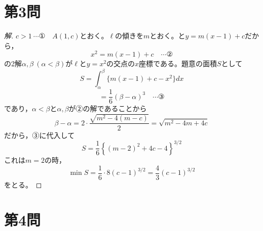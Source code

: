 \documentclass[../main.tex]{subfiles}
\begin{document}
\newpage

\section*{第3問}

\begin{proof}[解]
  $c>1\ \cdots$①　$A(1,c)$とおく。$\ell$の傾きを$m$とおく。と$y=m(x-1)+c$だから，
  \[
    x^2=m(x-1)+c \quad\cdots\text{②}
  \]
  の2解$\alpha,\beta\ (\alpha<\beta)$が$\ell$と$y=x^2$の交点の$x$座標である。題意の面積$S$として
  \[
    S=\int_\alpha^\beta\{m(x-1)+c-x^2\}dx
  \]
  \[
    =\frac16(\beta-\alpha)^3 \quad\cdots\text{③}
  \]
  であり，$\alpha<\beta$と$\alpha,\beta$が②の解であることから
  \[
    \beta-\alpha=2\cdot\frac{\sqrt{m^2-4(m-c)}}{2}=\sqrt{m^2-4m+4c}
  \]
  だから，③に代入して
  \[
    S=\frac16\left\{(m-2)^2+4c-4\right\}^{3/2}
  \]
  これは$m=2$の時，
  \[
    \min S=\frac16\cdot8(c-1)^{3/2}=\frac43(c-1)^{3/2}
  \]
  をとる。
\end{proof}

\newpage

\section*{第4問}
\end{document}
